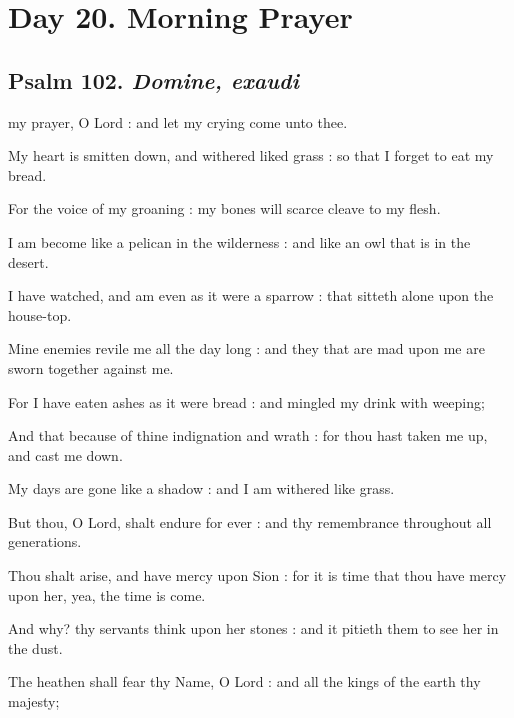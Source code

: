 \section*{Day 20. Morning Prayer}

\subsection{Psalm 102. \textit{Domine, exaudi}}

 my prayer, O Lord : and let my crying come unto thee.\par
{}
My heart is smitten down, and withered liked grass : so that I forget to eat my bread.\par
{}For the voice of my groaning : my bones will scarce cleave to my flesh.\par
{}I am become like a pelican in the wilderness : and like an owl that is in the desert.\par
{}I have watched, and am even as it were a sparrow : that sitteth alone upon the house-top.\par
{}Mine enemies revile me all the day long : and they that are mad upon me are sworn together against me.\par
{}For I have eaten ashes as it were bread : and mingled my drink with weeping;\par
{}And that because of thine indignation and wrath : for thou hast taken me up, and cast me down.\par
{}My days are gone like a shadow : and I am withered like grass.\par
{}But thou, O Lord, shalt endure for ever : and thy remembrance throughout all generations.\par
{}Thou shalt arise, and have mercy upon Sion : for it is time that thou have mercy upon her, yea, the time is come.\par
{}And why? thy servants think upon her stones : and it pitieth them to see her in the dust.\par
{}The heathen shall fear thy Name, O Lord : and all the kings of the earth thy majesty;\par
